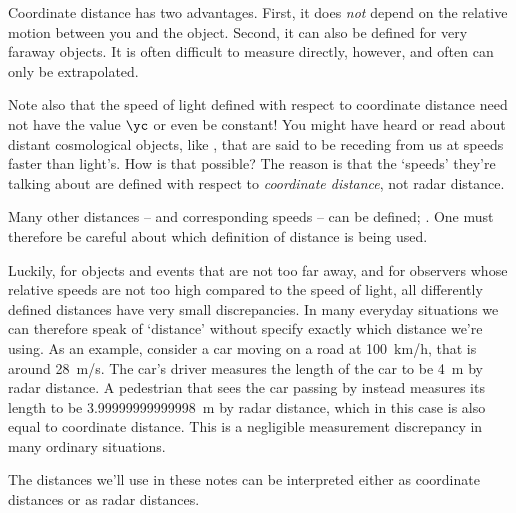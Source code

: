 Coordinate distance has two advantages. First, it does \emph{not} depend on the relative motion between you and the object. Second, it can also be defined for very faraway objects. It is often difficult to measure directly, however, and often can only be extrapolated.

Note also that the speed of light defined with respect to coordinate distance need not have the value $\yc$ or even be constant! You might have heard or read about  distant cosmological objects, like , that are said to be receding from us at speeds faster than light's. How is that possible? The reason is that the \enquote*{speeds} they're talking about are defined with respect to \emph{coordinate distance}, not radar distance.

\medskip

Many other distances -- and corresponding speeds -- can be defined; . One must therefore be careful about which definition of distance is being used.

Luckily, for objects and events that are not too far away, and for observers whose relative speeds are not too high compared to the speed of light, all differently defined distances have very small discrepancies. In many everyday situations we can therefore speak of \enquote*{distance} without specify exactly which distance we're using. As an example, consider a car moving on a road at \qty{100}{km/h}, that is around \qty{28}{m/s}. The car's driver measures the length of the car to be \qty{4}{m} by radar distance. A pedestrian that sees the car passing by instead measures its length to be \qty{3.99999999999998}{m} by radar distance, which in this case is also equal to coordinate distance. This is a negligible measurement discrepancy in many ordinary situations.

The distances we'll use in these notes can be interpreted either as coordinate distances or as radar distances.

\medskip

